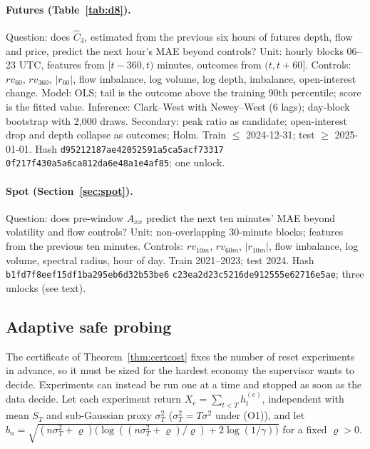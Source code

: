\paragraph{Futures (Table~\ref{tab:d8}).} Question: does $\hat C_3$, estimated from the previous six hours of futures depth, flow and price, predict the next hour's MAE beyond controls? Unit: hourly blocks 06--23 UTC, features from $[t-360,t)$ minutes, outcomes from $(t,t+60]$. Controls: $rv_{60}$, $rv_{360}$, $|r_{60}|$, flow imbalance, log volume, log depth, imbalance, open-interest change. Model: OLS; tail is the outcome above the training 90th percentile; score is the fitted value. Inference: Clark--West with Newey--West (6 lags); day-block bootstrap with 2,000 draws. Secondary: peak ratio as candidate; open-interest drop and depth collapse as outcomes; Holm. Train $\le$ 2024-12-31; test $\ge$ 2025-01-01. Hash \texttt{d95212187ae42052591a5ca5acf73317} \texttt{0f217f430a5a6ca812da6e48a1e4af85}; one unlock.

\paragraph{Spot (Section~\ref{sec:spot}).} Question: does pre-window $A_{xx}$ predict the next ten minutes' MAE beyond volatility and flow controls? Unit: non-overlapping 30-minute blocks; features from the previous ten minutes. Controls: $rv_{10m}$, $rv_{60m}$, $|r_{10m}|$, flow imbalance, log volume, spectral radius, hour of day. Train 2021--2023; test 2024. Hash \texttt{b1fd7f8eef15df1ba295eb6d32b53be6} \texttt{c23ea2d23c5216de912555e62716e5ae}; three unlocks (see text).

\subsection{Adaptive safe probing}\label{app:probe}
The certificate of Theorem~\ref{thm:certcost} fixes the number of reset experiments in advance, so it must be sized for the hardest economy the supervisor wants to decide. Experiments can instead be run one at a time and stopped as soon as the data decide. Let each experiment return $X_e=\sum_{t<T}h^{(e)}_t$, independent with mean $S_T$ and sub-Gaussian proxy $\sigma_T^2$ ($\sigma_T^2=T\sigma^2$ under (O1)), and let $b_n=\sqrt{(n\sigma_T^2+\varrho)\bigl(\log((n\sigma_T^2+\varrho)/\varrho)+2\log(1/\gamma)\bigr)}$ for a fixed $\varrho>0$.

